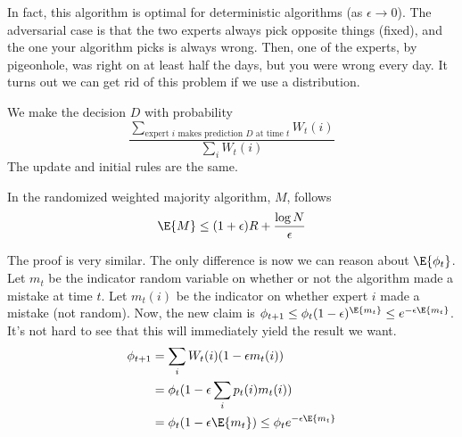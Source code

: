 In fact, this algorithm is optimal for deterministic algorithms (as $\epsilon \to 0$).
The adversarial case is that the two experts always pick opposite things (fixed), and the
one your algorithm picks is always wrong. Then, one of the experts, by pigeonhole,
was right on at least half the days, but you were wrong every day.
It turns out we can get rid of this problem if we use a distribution.

\begin{algothm}
    We make the decision $D$ with probability
    \[ \frac{\sum_{\text{expert } i \text{ makes prediction } D \text{ at time } t} W_t(i)}{\sum_{i} W_t(i)}  \] 
    The update and initial rules are the same.   
\end{algothm}

\begin{theorem}
    In the randomized weighted majority algorithm, $M$, follows
    \[ \E{M} \le (1 + \epsilon) R + \frac{\log N}{\epsilon} \]

    \begin{proof*}
    The proof is very similar. The only difference is now we can
    reason about $\E{\phi_t}$. Let $m_t$ be the indicator
    random variable on whether or not the algorithm made a mistake
    at time $t$. Let $m_t(i)$ be the indicator on whether expert $i$
    made a mistake (not random).
    Now, the new claim is $\phi_{t + 1} \le \phi_t(1 - \epsilon)^{\E{m_t}} \le e^{-\epsilon \E{m_t}}$.
    It's not hard to see that this will immediately yield the result we want.
    \begin{align*}
        \phi_{t + 1} &= \sum_i W_t(i) (1 - \epsilon m_t(i)) \\
        &= \phi_t (1 - \epsilon \sum_i p_t(i) m_t(i)) \\
        &= \phi_t (1 - \epsilon \E{m_t}) \le \phi_t e^{-\epsilon \E{m_t}}
    \end{align*}
\end{proof*}

\end{theorem}
